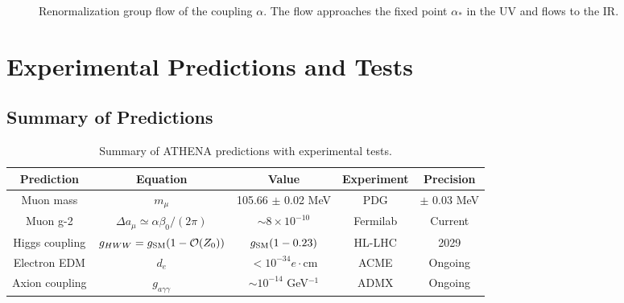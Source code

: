 \documentclass[12pt,oneside]{book}
\begin{document}
\begin{figure}[H]
\centering
{}
\caption{Renormalization group flow of the coupling $\alpha$. The flow approaches the fixed point $\alpha_*$ in the UV and flows to the IR.}
\label{fig:rg_flow}
\end{figure}

\chapter{Experimental Predictions and Tests}

\section{Summary of Predictions}

\begin{table}[H]
\centering
\begin{tabular}{|c|c|c|c|c|}
\hline
\textbf{Prediction} & \textbf{Equation} & \textbf{Value} & \textbf{Experiment} & \textbf{Precision} \\
\hline
Muon mass & $m_\mu$ & 105.66 $\pm$ 0.02 MeV & PDG & $\pm$ 0.03 MeV \\
Muon g-2 & $\Delta a_\mu \simeq \alpha\beta_0/(2\pi)$ & $\sim 8 \times 10^{-10}$ & Fermilab & Current \\
Higgs coupling & $g_{HWW} = g_{\rm SM}(1 - \mathcal{O}(Z_0))$ & $g_{\rm SM}(1 - 0.23)$ & HL-LHC & 2029 \\
Electron EDM & $d_e$ & $< 10^{-34} e\cdot\text{cm}$ & ACME & Ongoing \\
Axion coupling & $g_{a\gamma\gamma}$ & $\sim 10^{-14}$ GeV$^{-1}$ & ADMX & Ongoing \\
\hline
\end{tabular}
\caption{Summary of ATHENA predictions with experimental tests.}
\end{table}
\end{document}
